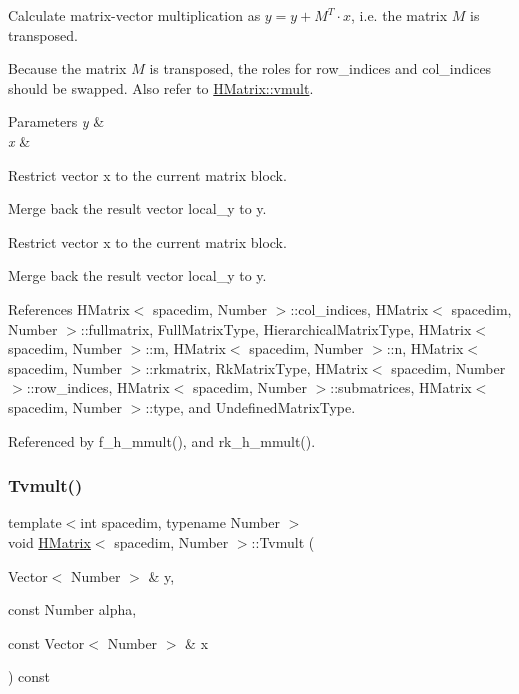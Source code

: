 Calculate matrix-\/vector multiplication as $y = y + M^T \cdot x$, i.\+e. the matrix $M$ is transposed.

Because the matrix $M$ is transposed, the roles for {\ttfamily row\+\_\+indices} and {\ttfamily col\+\_\+indices} should be swapped. Also refer to \hyperlink{classHMatrix_aa11b5761aba86606effd14b4bdf31912}{H\+Matrix\+::vmult}. 
\begin{DoxyParams}{Parameters}
{\em y} & \\
\hline
{\em x} & \\
\hline
\end{DoxyParams}
Restrict vector x to the current matrix block.

Merge back the result vector {\ttfamily local\+\_\+y} to {\ttfamily y}.

Restrict vector x to the current matrix block.

Merge back the result vector {\ttfamily local\+\_\+y} to {\ttfamily y}.

References H\+Matrix$<$ spacedim, Number $>$\+::col\+\_\+indices, H\+Matrix$<$ spacedim, Number $>$\+::fullmatrix, Full\+Matrix\+Type, Hierarchical\+Matrix\+Type, H\+Matrix$<$ spacedim, Number $>$\+::m, H\+Matrix$<$ spacedim, Number $>$\+::n, H\+Matrix$<$ spacedim, Number $>$\+::rkmatrix, Rk\+Matrix\+Type, H\+Matrix$<$ spacedim, Number $>$\+::row\+\_\+indices, H\+Matrix$<$ spacedim, Number $>$\+::submatrices, H\+Matrix$<$ spacedim, Number $>$\+::type, and Undefined\+Matrix\+Type.



Referenced by f\+\_\+h\+\_\+mmult(), and rk\+\_\+h\+\_\+mmult().

\mbox{\label{classHMatrix_a46298efb74444db494068cc3fab73431}} 
\subsubsection{\texorpdfstring{Tvmult()}{Tvmult()}\hspace{0.1cm}{\footnotesize\ttfamily [2/4]}}
{\footnotesize\ttfamily template$<$int spacedim, typename Number $>$ \\
void \hyperlink{classHMatrix}{H\+Matrix}$<$ spacedim, Number $>$\+::Tvmult (\begin{DoxyParamCaption}\item[{Vector$<$ Number $>$ \&}]{y,  }\item[{const Number}]{alpha,  }\item[{const Vector$<$ Number $>$ \&}]{x }\end{DoxyParamCaption}) const}

